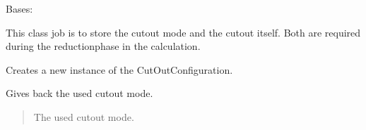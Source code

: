 \documentclass[letterpaper,10pt,english]{sphinxmanual}
\begin{document}
\begin{fulllineitems}
\label{\detokenize{apidoc/src.osm_configurator.model.project.configuration:src.osm_configurator.model.project.configuration.cut_out_configuration.CutOutConfiguration}}
\pysigstartsignatures
{}
\pysigstopsignatures
\sphinxAtStartPar
Bases: 

\sphinxAtStartPar
This class job is to store the cut\sphinxhyphen{}out mode and the cut\sphinxhyphen{}out itself. Both are required during the reduction\sphinxhyphen{}phase
in the calculation.

\begin{fulllineitems}
\label{\detokenize{apidoc/src.osm_configurator.model.project.configuration:src.osm_configurator.model.project.configuration.cut_out_configuration.CutOutConfiguration.__init__}}
\pysigstartsignatures
{}
\pysigstopsignatures
\sphinxAtStartPar
Creates a new instance of the CutOutConfiguration.

\end{fulllineitems}


\begin{fulllineitems}
\label{\detokenize{apidoc/src.osm_configurator.model.project.configuration:src.osm_configurator.model.project.configuration.cut_out_configuration.CutOutConfiguration.get_cut_out_mode}}
\pysigstartsignatures
{}
\pysigstopsignatures
\sphinxAtStartPar
Gives back the used cut\sphinxhyphen{}out mode.
\begin{quote}\begin{description}
\sphinxAtStartPar
The used cut\sphinxhyphen{}out mode.

\sphinxAtStartPar
{\hyperref[\detokenize{apidoc/src.osm_configurator.model.project.configuration:src.osm_configurator.model.project.configuration.cut_out_mode_enum.CutOutMode}]{}}


\end{description}
\end{quote}
\end{fulllineitems}
\end{fulllineitems}
\end{document}
